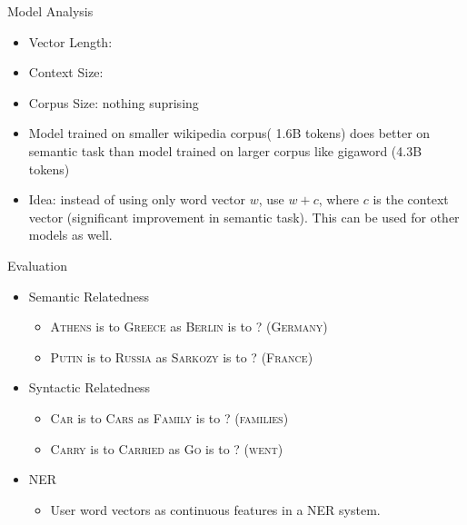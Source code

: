 \begin{frame}{Model Analysis}
  \begin{itemize}
  \item Vector Length:
  \item Context Size: 
  \item Corpus Size: nothing suprising
  \item Model trained on smaller wikipedia corpus( 1.6B tokens) does better on semantic task than model trained on larger corpus like gigaword (4.3B tokens)
  \item Idea: instead of using only word vector $w$, use $w+c$, where $c$ is the context vector (significant improvement in semantic task). This can be used for other models as well.
  \end{itemize}
\end{frame}

\begin{frame}{Evaluation}
  \begin{itemize}[<+->]
  \item Semantic Relatedness %
    \begin{itemize}
    \item \textsc{Athens} is to \textsc{Greece} as \textsc{Berlin} is to ? (\textsc{Germany})
    \item \textsc{Putin} is to \textsc{Russia} as \textsc{Sarkozy} is to ? (\textsc{France})
    \end{itemize}
  \item Syntactic Relatedness %
    \begin{itemize}
    \item \textsc{Car} is to \textsc{Cars} as \textsc{Family} is to ? (\textsc{families})
    \item \textsc{Carry} is to \textsc{Carried} as \textsc{Go} is to ? (\textsc{went})
    \end{itemize}
  \item NER 
    \begin{itemize}
    \item User word vectors as continuous features in a NER system.
    \end{itemize}
  \end{itemize}
\end{frame}

